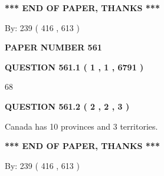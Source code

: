 \documentclass[12pt]{article}
\begin{document}
\vspace{1.0in} 
{\textbf{\large{ *** END OF PAPER, THANKS *** }}} 
   
   
\hspace{1.0in} By: 
 239 ( 416 ,  613 )
   
   
   
   
\newpage 
\setcounter{page}{ 
   561001 } 
   
   
   
   
 {\textbf{ \Large{ PAPER NUMBER  561  }}}
   
   
\vspace{0.2in}
   
   
   
   
   
   
 \vspace{0.2in}
 
 
 
 
   
   
  
\vspace{0.2in}
  
{\textbf{\Large{QUESTION
561.1 
 ( 1 , 1 , 6791 )
}}}
  
  
 
 
\noindent{}

68
 
 
  
\vspace{0.2in}
  
{\textbf{\Large{QUESTION
561.2 
 ( 2 , 2 , 3 )
}}}
  
  
 
 
\noindent{}
 
 
Canada has 10  provinces and 3 territories.
 
 
 
 
   
   
 \vspace{0.2in}
 
   
   
   
   
\vspace{1.0in} 
{\textbf{\large{ *** END OF PAPER, THANKS *** }}} 
   
   
\hspace{1.0in} By: 
 239 ( 416 ,  613 )
   
\end{document}
